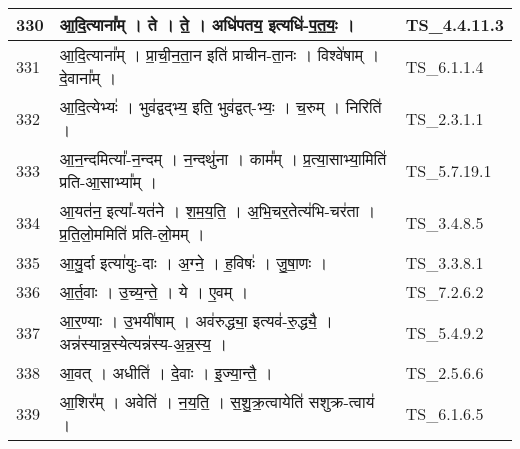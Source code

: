 \documentclass[17pt]{extarticle}
\begin{document}
\begin{longtable}{||p{0.4in}||p{4.9in}||p{0.9in}||}
    \hline
        
    330 & आ॒दि॒त्याना᳚म्   ।   ते   ।   ते॒   ।   अधि॑पतय॒ इत्यधि॑{-}प॒त॒यः॒   ।    & TS\_4.4.11.3       \\
    
    \hline
        
    331 & आ॒दि॒त्याना᳚म्   ।   प्रा॒ची॒न॒ता॒न इति॑ प्राचीन{-}ता॒नः   ।   विश्वे॑षाम्   ।   दे॒वाना᳚म्   ।    & TS\_6.1.1.4       \\
    
    \hline
        
    332 & आ॒दि॒त्येभ्यः॑   ।   भुव॑द्वद्भ्य॒ इति॒ भुव॑द्वत्{-}भ्यः॒   ।   च॒रुम्   ।   निरिति॑   ।    & TS\_2.3.1.1       \\
    
    \hline
        
    333 & आ॒न॒न्दमित्या᳚{-}न॒न्दम्   ।   न॒न्दथु॑ना   ।   काम᳚म्   ।   प्र॒त्या॒साभ्या॒मिति॑ प्रति{-}आ॒साभ्या᳚म्   ।    & TS\_5.7.19.1       \\
    
    \hline
        
    334 & आ॒यत॑न॒ इत्या᳚{-}यत॑ने   ।   श॒म॒य॒ति॒   ।   अ॒भि॒चर॒तेत्य॑भि{-}चर॑ता   ।   प्र॒ति॒लो॒ममिति॑ प्रति{-}लो॒मम्   ।    & TS\_3.4.8.5       \\
    
    \hline
        
    335 & आ॒यु॒र्दा इत्या॑युः{-}दाः   ।   अ॒ग्ने॒   ।   ह॒विषः॑   ।   जु॒षा॒णः   ।    & TS\_3.3.8.1       \\
    
    \hline
        
    336 & आ॒र्त॒वाः   ।   उ॒च्य॒न्ते॒   ।   ये   ।   ए॒वम्   ।    & TS\_7.2.6.2       \\
    
    \hline
        
    337 & आ॒र॒ण्याः   ।   उ॒भयी॑षाम्   ।   अव॑रुद्ध्या॒ इत्यव॑{-}रु॒द्ध्यै॒   ।   अन्न॑स्यान्न॒स्येत्यन्न॑स्य{-}अ॒न्न॒स्य॒   ।    & TS\_5.4.9.2       \\
    
    \hline
        
    338 & आ॒वत्   ।   अधीति॑   ।   दे॒वाः   ।   इ॒ज्या॒न्तै॒   ।    & TS\_2.5.6.6       \\
    
    \hline
        
    339 & आ॒शिर᳚म्   ।   अवेति॑   ।   न॒य॒ति॒   ।   स॒शु॒क्र॒त्वायेति॑ सशुक्र{-}त्वाय॑   ।    & TS\_6.1.6.5       \\
    

\end{longtable}
\end{document}
